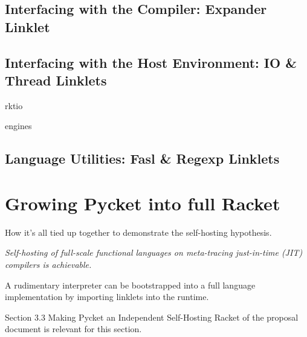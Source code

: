 		\subsection{Interfacing with the Compiler: Expander Linklet}

		\subsection{Interfacing with the Host Environment: IO \& Thread Linklets}
			\begin{todo}[TODO]
				rktio
			\end{todo}
			\begin{todo}[TODO]
				engines
			\end{todo}
		\subsection{Language Utilities: Fasl \& Regexp Linklets}

	\section{Growing Pycket into full Racket}

		\begin{mainpoint}
            How it's all tied up together to demonstrate the self-hosting hypothesis.

			\textit{Self-hosting of full-scale functional languages on meta-tracing just-in-time (JIT) compilers is achievable.}
        \end{mainpoint}

        \begin{todo}
			A rudimentary interpreter can be bootstrapped into a full language implementation by importing linklets into the runtime.
		\end{todo}

		\begin{todo}[Import]
			Section 3.3 Making Pycket an Independent Self-Hosting Racket of the proposal document is relevant for this section.
		\end{todo}